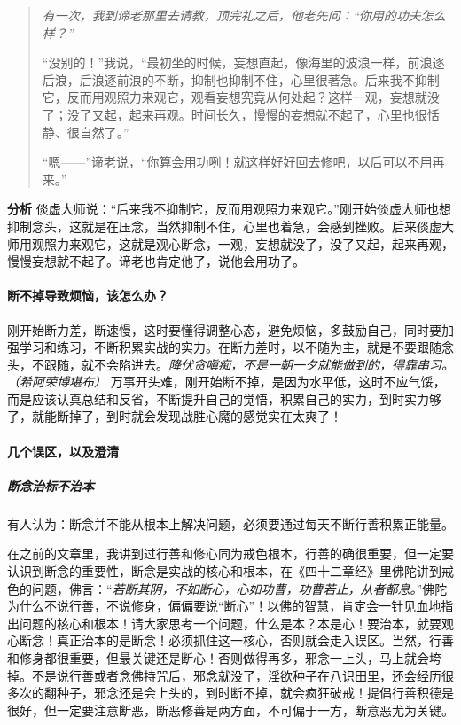 \begin{quotation}\it
    有一次，我到谛老那里去请教，顶完礼之后，他老先问：“你用的功夫怎么样？”

    “没别的！”我说，“最初坐的时候，妄想直起，像海里的波浪一样，前浪逐后浪，后浪逐前浪的不断，抑制也抑制不住，心里很著急。后来我不抑制它，反而用观照力来观它，观看妄想究竟从何处起？这样一观，妄想就没了；没了又起，起来再观。时间长久，慢慢的妄想就不起了，心里也很恬静、很自然了。”

    “嗯——”谛老说，“你算会用功咧！就这样好好回去修吧，以后可以不用再来。”
\end{quotation}

\textbf{分析} 倓虚大师说：“后来我不抑制它，反而用观照力来观它。”刚开始倓虚大师也想抑制念头，这就是在压念，当然抑制不住，心里也着急，会感到挫败。后来倓虚大师用观照力来观它，这就是观心断念，一观，妄想就没了，没了又起，起来再观，慢慢妄想就不起了。谛老也肯定他了，说他会用功了。

\paragraph{断不掉导致烦恼，该怎么办？}

刚开始断力差，断速慢，这时要懂得调整心态，避免烦恼，多鼓励自己，同时要加强学习和练习，不断积累实战的实力。在断力差时，以不随为主，就是不要跟随念头，不跟随，就不会陷进去。\textit{降伏贪嗔痴，不是一朝一夕就能做到的，得靠串习。（希阿荣博堪布）} 万事开头难，刚开始断不掉，是因为水平低，这时不应气馁，而是应该认真总结和反省，不断提升自己的觉悟，积累自己的实力，到时实力够了，就能断掉了，到时就会发现战胜心魔的感觉实在太爽了！

\paragraph{几个误区，以及澄清}

\subparagraph{断念治标不治本}

有人认为：断念并不能从根本上解决问题，必须要通过每天不断行善积累正能量。

在之前的文章里，我讲到过行善和修心同为戒色根本，行善的确很重要，但一定要认识到断念的重要性，断念是实战的核心和根本，在《四十二章经》里佛陀讲到戒色的问题，佛言：“\textit{若断其阴，不如断心，心如功曹，功曹若止，从者都息。}”佛陀为什么不说行善，不说修身，偏偏要说“断心”！以佛的智慧，肯定会一针见血地指出问题的核心和根本！请大家思考一个问题，什么是本？本是心！要治本，就要观心断念！真正治本的是断念！必须抓住这一核心，否则就会走入误区。当然，行善和修身都很重要，但最关键还是断心！否则做得再多，邪念一上头，马上就会垮掉。不是说行善或者念佛持咒后，邪念就没了，淫欲种子在八识田里，还会经历很多次的翻种子，邪念还是会上头的，到时断不掉，就会疯狂破戒！提倡行善积德是很好，但一定要注意断恶，断恶修善是两方面，不可偏于一方，断意恶尤为关键。

